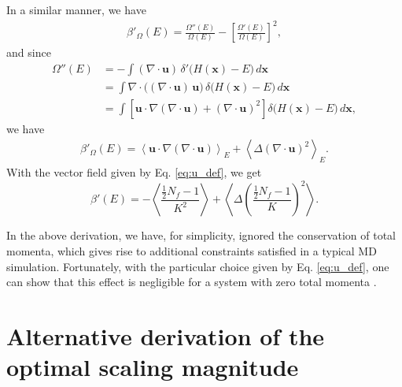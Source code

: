 \documentclass[reprint]{revtex4-1}
\begin{document}
In a similar manner, we have
%
\begin{align*}
  \beta'_\Omega(E)
  =
  \frac
  {
    \Omega''(E)
  }
  {
    \Omega(E)
  }
  -
  \left[
    \frac
    {
      \Omega'(E)
    }
    {
      \Omega(E)
    }
  \right]^2
  ,
\end{align*}
%
and since
%
\begin{align*}
  \Omega''(E)
  &= -\int
      \left( \nabla \cdot \mathbf u \right) \,
      \delta'\bigl( H(\mathbf x) - E \bigr) \, d\mathbf x
  \\
  &= \int
     \nabla \cdot \bigl( (\nabla \cdot \mathbf u) \, \mathbf u \bigr) \,
     \delta\bigl( H(\mathbf x) - E \bigr) \, d\mathbf x
  \\
  &= \int
     \left[
     \mathbf u \cdot \nabla (\nabla \cdot \mathbf u)
     +
     (\nabla \cdot \mathbf u)^2
     \right]
     \delta\bigl( H(\mathbf x) - E \bigr) \, d\mathbf x
  ,
\end{align*}
%
we have
%
\begin{align*}
  \beta'_\Omega(E)
  =
  \left\langle
     \mathbf u \cdot \nabla (\nabla \cdot \mathbf u)
  \right\rangle_E
  +
  \left\langle
    \Delta (\nabla \cdot \mathbf u)^2
  \right\rangle_E
  .
\end{align*}
%
With the vector field given by Eq. \eqref{eq:u_def},
we get
\begin{equation}
  \beta'(E)
  =
  -
  \left\langle
    \frac{ \frac{1}{2} N_f - 1 } { K^2 }
  \right\rangle
  +
  \left\langle
    \Delta
    \left(
      \frac{ \frac{1}{2} N_f - 1 } { K }
    \right)^2
  \right\rangle
  .
  \label{eq:dbetadE}
\end{equation}

In the above derivation,
we have, for simplicity, ignored the conservation
of total momenta\cite{shirts2006, uline2008},
which gives rise to additional constraints
satisfied in a typical MD simulation\cite{lado1981, wallace1983}.
%
Fortunately, with the particular choice given by Eq. \eqref{eq:u_def},
one can show that this effect is negligible for a system
with zero total momenta\cite{uline2008}
\big[a key observation here is
that for the total momenta $P_\nu = \sum_{i} p_{i, \nu}$,
$\nu = x,y,z$, we have
$\mathbf u \cdot \nabla P_\nu = P_\nu/(2K) = 0$\big].










\section{\label{sec:error}
  Alternative derivation of
  the optimal scaling magnitude
}
\end{document}
